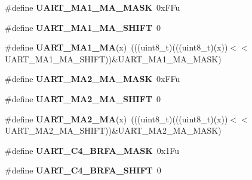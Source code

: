 \begin{DoxyCompactItemize}
\item 
\#define {\bfseries U\+A\+R\+T\+\_\+\+M\+A1\+\_\+\+M\+A\+\_\+\+M\+A\+SK}~0x\+F\+Fu\hypertarget{group__UART__Register__Masks_gaa4fe1e60d0ca635fd633af77c3b63998}{}\label{group__UART__Register__Masks_gaa4fe1e60d0ca635fd633af77c3b63998}

\item 
\#define {\bfseries U\+A\+R\+T\+\_\+\+M\+A1\+\_\+\+M\+A\+\_\+\+S\+H\+I\+FT}~0\hypertarget{group__UART__Register__Masks_ga878daa0e87ec3da2299c223b6b234976}{}\label{group__UART__Register__Masks_ga878daa0e87ec3da2299c223b6b234976}

\item 
\#define {\bfseries U\+A\+R\+T\+\_\+\+M\+A1\+\_\+\+MA}(x)~(((uint8\+\_\+t)(((uint8\+\_\+t)(x))$<$$<$U\+A\+R\+T\+\_\+\+M\+A1\+\_\+\+M\+A\+\_\+\+S\+H\+I\+FT))\&U\+A\+R\+T\+\_\+\+M\+A1\+\_\+\+M\+A\+\_\+\+M\+A\+SK)\hypertarget{group__UART__Register__Masks_ga6602fd7e07866385c7cd1ad2784fe334}{}\label{group__UART__Register__Masks_ga6602fd7e07866385c7cd1ad2784fe334}

\item 
\#define {\bfseries U\+A\+R\+T\+\_\+\+M\+A2\+\_\+\+M\+A\+\_\+\+M\+A\+SK}~0x\+F\+Fu\hypertarget{group__UART__Register__Masks_ga700f51ab869350daee42b8ae9c655ffd}{}\label{group__UART__Register__Masks_ga700f51ab869350daee42b8ae9c655ffd}

\item 
\#define {\bfseries U\+A\+R\+T\+\_\+\+M\+A2\+\_\+\+M\+A\+\_\+\+S\+H\+I\+FT}~0\hypertarget{group__UART__Register__Masks_ga1ecfe245065ed459b087fc0d629b3f07}{}\label{group__UART__Register__Masks_ga1ecfe245065ed459b087fc0d629b3f07}

\item 
\#define {\bfseries U\+A\+R\+T\+\_\+\+M\+A2\+\_\+\+MA}(x)~(((uint8\+\_\+t)(((uint8\+\_\+t)(x))$<$$<$U\+A\+R\+T\+\_\+\+M\+A2\+\_\+\+M\+A\+\_\+\+S\+H\+I\+FT))\&U\+A\+R\+T\+\_\+\+M\+A2\+\_\+\+M\+A\+\_\+\+M\+A\+SK)\hypertarget{group__UART__Register__Masks_gaf2427a2534075e01475f46219e742b00}{}\label{group__UART__Register__Masks_gaf2427a2534075e01475f46219e742b00}

\item 
\#define {\bfseries U\+A\+R\+T\+\_\+\+C4\+\_\+\+B\+R\+F\+A\+\_\+\+M\+A\+SK}~0x1\+Fu\hypertarget{group__UART__Register__Masks_ga2f0ab4e5358add87747c744f8ba324fb}{}\label{group__UART__Register__Masks_ga2f0ab4e5358add87747c744f8ba324fb}

\item 
\#define {\bfseries U\+A\+R\+T\+\_\+\+C4\+\_\+\+B\+R\+F\+A\+\_\+\+S\+H\+I\+FT}~0\hypertarget{group__UART__Register__Masks_gae8cac47de1cbd8f8bd2cb10133e4f603}{}\label{group__UART__Register__Masks_gae8cac47de1cbd8f8bd2cb10133e4f603}


\end{DoxyCompactItemize}
